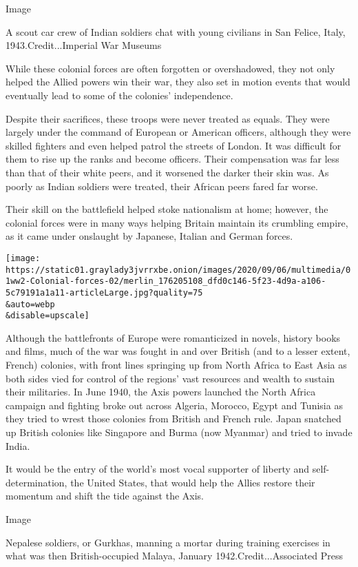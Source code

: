 Image

A scout car crew of Indian soldiers chat with young civilians in San
Felice, Italy, 1943.Credit...Imperial War Museums

While these colonial forces are often forgotten or overshadowed, they
not only helped the Allied powers win their war, they also set in motion
events that would eventually lead to some of the colonies' independence.

Despite their sacrifices, these troops were never treated as equals.
They were largely under the command of European or American officers,
although they were skilled fighters and even helped patrol the streets
of London. It was difficult for them to rise up the ranks and become
officers. Their compensation was far less than that of their white
peers, and it worsened the darker their skin was. As poorly as Indian
soldiers were treated, their African peers fared far worse.

Their skill on the battlefield helped stoke nationalism at home;
however, the colonial forces were in many ways helping Britain maintain
its crumbling empire, as it came under onslaught by Japanese, Italian
and German forces.

\texttt{[image: https://static01.graylady3jvrrxbe.onion/images/2020/09/06/multimedia/01ww2-Colonial-forces-02/merlin\_176205108\_dfd0c146-5f23-4d9a-a106-5c79191a1a11-articleLarge.jpg?quality=75\\\&auto=webp\\\&disable=upscale]}

Although the battlefronts of Europe were romanticized in novels, history
books and films, much of the war was fought in and over British (and to
a lesser extent, French) colonies, with front lines springing up from
North Africa to East Asia as both sides vied for control of the regions'
vast resources and wealth to sustain their militaries. In June 1940, the
Axis powers launched the North Africa campaign and fighting broke out
across Algeria, Morocco, Egypt and Tunisia as they tried to wrest those
colonies from British and French rule. Japan snatched up British
colonies like Singapore and Burma (now Myanmar) and tried to invade
India.

It would be the entry of the world's most vocal supporter of liberty and
self-determination, the United States, that would help the Allies
restore their momentum and shift the tide against the Axis.

Image

Nepalese soldiers, or Gurkhas, manning a mortar during training
exercises in what was then British-occupied Malaya, January
1942.Credit...Associated Press

